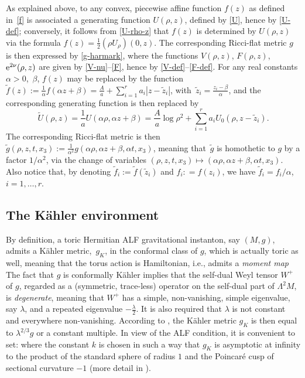 \documentclass[10pt,a4paper]{amsart}
\numberwithin{equation}{section}
\begin{document}
\begin{rem} \label{rem-change} As explained above, to any convex, piecewise affine function $f (z)$ as defined in~\eqref{f} is associated a generating function $U (\rho, z)$, defined by \eqref{U}, hence by \eqref{U-def}; conversely, it follows from \eqref{U-rho-z} that $f (z)$ is determined by $U (\rho, z)$ via the formula $f (z) = \frac{1}{2} (\rho U_{\rho}) (0, z)$. The corresponding Ricci-flat metric $g$ is then expressed by \eqref{g-harmark}, where the functions $V (\rho, z)$, $F (\rho, z)$, ${\rm e}^{2 \nu} (\rho, z)$ are given by \eqref{V-nu}--\eqref{F}, hence by \eqref{V-def}--\eqref{F-def}. For any real constants $\alpha > 0$,~$\beta$, $f (z)$ may be replaced by the function $\tilde{f} (z) := \frac{1}{\alpha} f (\alpha z + \beta) = \frac{A}{a} + \sum _{i = 1}^r a _i |z - \tilde{z}_i|$, with~$\tilde{z}_i = \frac{z_i - \beta}{\alpha}$, and the corresponding generating function is then replaced by
\[\tilde{U} (\rho, z) = \frac{1}{a} U (\alpha \rho, \alpha z + \beta) = \frac{A}{a} \log{\rho ^2} + \sum _{i = 1} ^r a _i U_0 (\rho, z - \tilde{z} _i).\]
 The corresponding Ricci-flat metric is then $\tilde{g} (\rho, z, t, x_3) := \frac{1}{\alpha ^2} g (\alpha \rho, \alpha z + \beta, \alpha t, x _3)$, meaning that~$\tilde{g}$ is homothetic to $g$ by a factor $1/\alpha ^2$, via the change of variables $(\rho, z, t, x _3) \mapsto (\alpha \rho, \alpha z + \beta, \alpha t, x_3)$. Also notice that, by denoting $\tilde{f} _i := \tilde{f} (\tilde{z} _i)$ and $f_i : = f (z _i)$, we have
$\tilde{f} _i = f_i/\alpha$, $i = 1, \dots, r$. \end{rem}

\subsection{The K\"ahler environment} \label{sskaehler}
By definition, a toric Hermitian ALF gravitational instanton, say $(M, g)$, admits a K\"ahler metric,~$g _K$, in the conformal class of $g$, which is actually toric as well, meaning that the torus action is Hamiltonian, i.e., admits a {\it moment map} The fact that $g$ is conformally K\"ahler implies that the self-dual Weyl tensor $W ^+$ of $g$, regarded as a (symmetric, trace-less) operator on the self-dual part of $\Lambda ^2 M$, is {\it degenerate}, meaning that $W^+$ has a simple, non-vanishing, simple eigenvalue, say $\lambda$, and a repeated eigenvalue $- \frac{\lambda}{2}$. It is also required that $\lambda$ is not constant and everywhere non-vanishing. According to \cite{derdzinski}, the K\"ahler metric $g _K$ is then equal to $\lambda ^{2/3} g$ or a constant multiple. In view of the ALF condition, it is convenient to set:  where the constant $k$ is chosen in such a way that
$g_K$ is asymptotic at infinity to the product of the standard sphere of radius $1$ and the Poincar\'e cusp of sectional curvature $-1$ (more detail in \cite[Section~2]{BG}).
\end{document}

